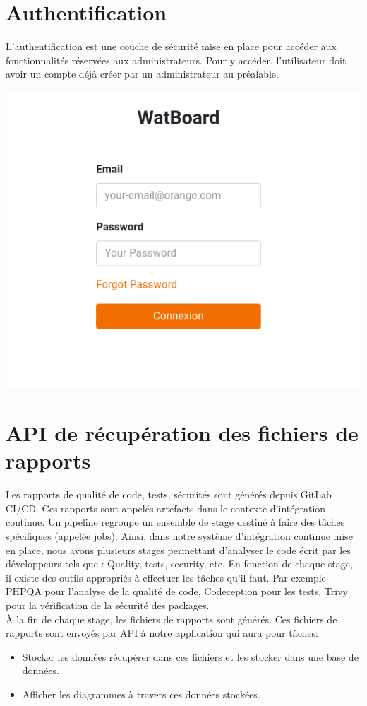 	\section{Authentification}
		L'authentification est une couche de sécurité mise en place pour accéder aux fonctionnalités réservées aux administrateurs. Pour y accéder, l’utilisateur doit avoir un compte déjà créer par un administrateur au préalable.
		\begin{center}
			\includegraphics[scale=0.4]{chap_3/authen.png}
			\label{Authenfication}
		\end{center}
	\section{API de récupération des fichiers de rapports}
		Les rapports de qualité de code, tests, sécurités sont générés depuis GitLab CI/CD. 
		Ces rapports sont appelés artefacts dans le contexte d’intégration continue. Un pipeline regroupe un ensemble de stage destiné à faire des tâches spécifiques (appelée jobs). Ainsi, dans notre système d’intégration continue mise en place, nous avons plusieurs stages permettant d’analyser le code écrit par les développeurs tels que : Quality, tests, security, etc.  En fonction de chaque stage, il existe des outils appropriés à effectuer les tâches qu’il faut. Par exemple   PHPQA pour l’analyse de la qualité de code, Codeception pour les tests, Trivy pour la vérification de la sécurité des packages.\\
		À la fin de chaque stage, les fichiers de rapports sont générés. Ces fichiers de rapports sont envoyés par API à notre application qui aura pour tâches:
		\begin{itemize}
			\item Stocker les données récupérer dans ces fichiers et les stocker dans une base de données.
			\item Afficher les diagrammes à travers ces données stockées.
		\end{itemize}  
		
